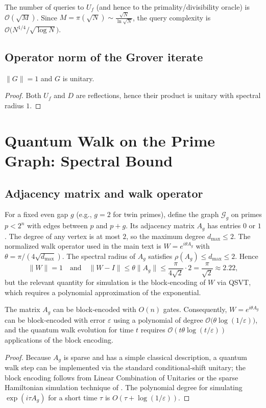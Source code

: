 \documentclass[12pt,a4paper]{article}
\begin{document}
\begin{corollary}
The number of queries to \(U_f\) (and hence to the primality/divisibility oracle) is \(\mathcal{O}(\sqrt{M})\).  Since \(M = \pi(\sqrt{N}) \sim \frac{\sqrt{N}}{\ln\sqrt{N}}\), the query complexity is \(\mathcal{O}\bigl(N^{1/4} / \sqrt{\log N}\bigr)\).
\end{corollary}

\subsection{Operator norm of the Grover iterate}
\begin{lemma}
\(\|G\| = 1\) and \(G\) is unitary.
\end{lemma}
\begin{proof}
Both \(U_f\) and \(D\) are reflections, hence their product is unitary with spectral radius \(1\).
\end{proof}

\section{Quantum Walk on the Prime Graph: Spectral Bound}

\subsection{Adjacency matrix and walk operator}
For a fixed even gap \(g\) (e.g., \(g=2\) for twin primes), define the graph \(\mathcal{G}_g\) on primes \(p<2^n\) with edges between \(p\) and \(p+g\).  Its adjacency matrix \(A_g\) has entries \(0\) or \(1\).  The degree of any vertex is at most \(2\), so the maximum degree \(d_{\max} \le 2\).  The normalized walk operator used in the main text is \(W = e^{i\theta A_g}\) with \(\theta = \pi/(4\sqrt{d_{\max}})\).  The spectral radius of \(A_g\) satisfies \(\rho(A_g) \le d_{\max} \le 2\).  Hence
\[
\|W\| = 1 \quad\text{and}\quad \|W - I\| \le \theta \|A_g\| \le \frac{\pi}{4\sqrt{2}} \cdot 2 = \frac{\pi}{\sqrt{2}} \approx 2.22,
\]
but the relevant quantity for simulation is the block‑encoding of \(W\) via QSVT, which requires a polynomial approximation of the exponential.

\begin{lemma}
The matrix \(A_g\) can be block‑encoded with \(O(n)\) gates.  Consequently, \(W = e^{i\theta A_g}\) can be block‑encoded with error \(\varepsilon\) using a polynomial of degree \(\mathcal{O}\bigl(\theta \log(1/\varepsilon)\bigr)\), and the quantum walk evolution for time \(t\) requires \(\mathcal{O}(t\theta \log(t/\varepsilon))\) applications of the block encoding.
\end{lemma}
\begin{proof}
Because \(A_g\) is sparse and has a simple classical description, a quantum walk step can be implemented via the standard conditional‑shift unitary; the block encoding follows from Linear Combination of Unitaries or the sparse Hamiltonian simulation technique of \cite{childs2017}.  The polynomial degree for simulating \(\exp(i\tau A_g)\) for a short time \(\tau\) is \(O(\tau + \log(1/\varepsilon))\).
\end{proof}
\end{document}
